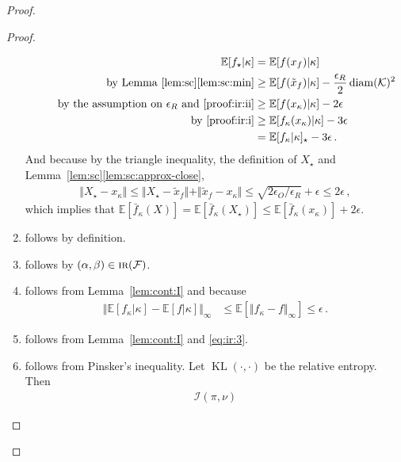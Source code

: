 \documentclass[letter, 12pt]{report}
\newcommand{\epsR}{{\epsilon_R}}
\newcommand{\epsO}{{\epsilon_O}}
\newcommand{\KL}{\operatorname{KL}}
\newcommand{\snorm}[1]{ \Vert  #1 \Vert}
\newcommand{\E}{\mathbb E}
\newcommand{\cK}{\mathcal K}
\newcommand{\cF}{\mathcal F}
\newcommand{\diam}{\operatorname{diam}}
\newcommand{\I}{\mathcal{I}}
\newcommand{\1}{\mathbf{1}}
\newcommand{\IR}{\operatorname{\textsc{ir}}}
\theoremstyle{plain}
\theoremstyle{definition}
\theoremstyle{remark}
\begin{document}
\begin{proof}
\begin{proof}
\begin{enumerate}
                  \begin{align*}
                      \E[f_\star|\kappa]
                       & = \E[f(x_f)|\kappa]                                          \\
                      \tag*{by Lemma~\ref{lem:sc}\ref{lem:sc:min}}
                       & \geq \E[f(\tilde x_f)|\kappa] - \frac{\epsR}{2} \diam(\cK)^2 \\
                      \tag*{by the assumption on $\epsR$ and \ref{proof:ir:ii}}
                       & \geq \E[f(x_\kappa)|\kappa] - 2\epsilon                      \\
                      \tag*{by \ref{proof:ir:i}}
                       & \geq \E[f_\kappa(x_\kappa)|\kappa] - 3\epsilon               \\
                       & = \E[f_\kappa|\kappa]_\star - 3\epsilon \,.
                  \end{align*}
                  And because by the triangle inequality, the definition of $X_\star$ and Lemma~\ref{lem:sc}\ref{lem:sc:approx-close},
                  \begin{align}
                      \snorm{X_\star - x_\kappa}
                      \leq \snorm{X_\star - \tilde x_f} + \snorm{\tilde x_f - x_\kappa}
                      \leq \sqrt{2\epsO / \epsR} + \epsilon
                      \leq 2 \epsilon\,,
                      \label{eq:ir:3}
                  \end{align}
                  which implies that $\E[\bar f_\kappa(X)] = \E[\bar f_\kappa(X_\star)] \leq \E[\bar f_\kappa(x_\kappa)] + 2 \epsilon$.
            \item follows by definition.
            \item follows by $(\alpha, \beta) \in \IR(\cF)$.
            \item follows from Lemma~\ref{lem:cont:I} and because
                  \begin{align*}
                      \snorm{\E[f_\kappa|\kappa] - \E[f|\kappa]}_\infty
                       & \leq \E[\snorm{f_\kappa - f}_\infty] \leq \epsilon \,.
                  \end{align*}
            \item follows from Lemma~\ref{lem:cont:I} and \cref{eq:ir:3}.
            \item follows from Pinsker's inequality. Let $\KL(\cdot, \cdot)$ be the relative entropy. Then
                  \begin{align*}
                      \I(\pi, \nu)

\end{align*}
\end{enumerate}
\end{proof}
\end{proof}
\end{document}
